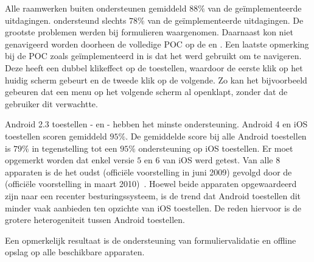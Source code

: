 Alle raamwerken buiten \lungo{} ondersteunen gemiddeld $88\%$ van de geïmplementeerde uitdagingen.
\lungo{} ondersteund slechts $78\%$ van de geïmplementeerde uitdagingen.
De grootste problemen werden bij formulieren waargenomen.
Daarnaast kon niet genavigeerd worden doorheen de volledige POC op de \htc{} en \gtab{}. %
Een laatste opmerking bij de POC zoals geïmplementeerd in \lungo{} is dat het  werd gebruikt om te navigeren.
Deze heeft een dubbel klikeffect op de toestellen, waardoor de eerste klik op het huidig scherm gebeurt en de tweede klik op de volgende.
Zo kan het bijvoorbeeld gebeuren dat een menu op het volgende scherm al openklapt, zonder dat de gebruiker dit verwachtte.

Android 2.3 toestellen - \htc{} en \gtab{} - hebben het minste ondersteuning.
Android 4 en iOS toestellen scoren gemiddeld $95\%$.
De gemiddelde score bij alle Android toestellen is $79\%$ in tegenstelling tot een $95\%$ ondersteuning op iOS toestellen.
Er moet opgemerkt worden dat enkel versie $5$ en $6$ van iOS werd getest.
Van alle $8$ apparaten is de \iphoneiii{} het oudst (officiële voorstelling in juni 2009) gevolgd door de \gs{} (officiële voorstelling in maart 2010)~\cite{Staff2009,Gideon2010}.
Hoewel beide apparaten opgewaardeerd zijn naar een recenter besturingssysteem, is de trend dat Android toestellen dit minder vaak aanbieden ten opzichte van iOS toestellen. %
De reden hiervoor is de grotere heterogeniteit tussen Android toestellen.


Een opmerkelijk resultaat is de ondersteuning van formuliervalidatie en offline opslag op alle beschikbare apparaten.


